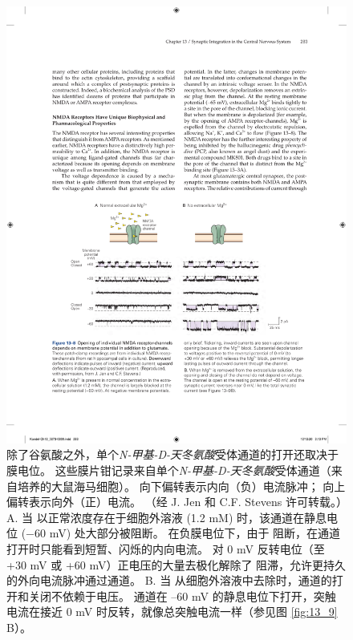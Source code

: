 \begin{figure}[htbp]
	\centering
	\includegraphics[width=0.8\linewidth]{chap13/fig_13_8}
	\caption{除了谷氨酸之外，单个\textit{N-甲基-D-天冬氨酸}受体通道的打开还取决于膜电位。 这些膜片钳记录来自单个\textit{N-甲基-D-天冬氨酸}受体通道（来自培养的大鼠海马细胞）。 向下偏转表示内向（负）电流脉冲； 向上偏转表示向外（正）电流。 （经 J. Jen 和 C.F. Stevens 许可转载。）A. 当  以正常浓度存在于细胞外溶液 (1.2 mM) 时，该通道在静息电位 (−60 mV) 处大部分被阻断。 在负膜电位下，由于  阻断，在通道打开时只能看到短暂、闪烁的内向电流。 对 0 mV 反转电位（至 +30 mV 或 +60 mV）正电压的大量去极化解除了  阻滞，允许更持久的外向电流脉冲通过通道。 B. 当  从细胞外溶液中去除时，通道的打开和关闭不依赖于电压。 通道在 –60 mV 的静息电位下打开，突触电流在接近 0 mV 时反转，就像总突触电流一样（参见图 \ref{fig:13_9} B）。}
	\label{fig:13_8}
\end{figure}


